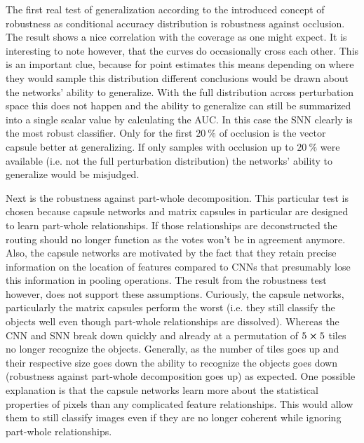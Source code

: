 The first real test of generalization according to the introduced concept of robustness as conditional accuracy distribution is robustness against occlusion. The result shows a nice correlation with the coverage as one might expect. It is interesting to note however, that the curves do occasionally cross each other. This is an important clue, because for point estimates this means depending on where they would sample this distribution different conclusions would be drawn about the networks’ ability to generalize. With the full distribution across perturbation space this does not happen and the ability to generalize can still be summarized into a single scalar value by calculating the AUC. In this case the SNN clearly is the most robust classifier. Only for the first $\SI{20}{\percent}$ of occlusion is the vector capsule better at generalizing. If only samples with occlusion up to $\SI{20}{\percent}$ were available (i.e. not the full perturbation distribution) the networks’ ability to generalize would be misjudged.

Next is the robustness against part-whole decomposition. This particular test is chosen because capsule networks and matrix capsules in particular are designed to learn part-whole relationships. If those relationships are deconstructed the routing should no longer function as the votes won’t be in agreement anymore. Also, the capsule networks are motivated by the fact that they retain precise information on the location of features compared to CNNs that presumably lose this information in pooling operations. The result from the robustness test however, does not support these assumptions. Curiously, the capsule networks, particularly the matrix capsules perform the worst (i.e. they still classify the objects well even though part-whole relationships are dissolved). Whereas the CNN and SNN break down quickly and already at a permutation of $5\cross 5$ tiles no longer recognize the objects. Generally, as the number of tiles goes up and their respective size goes down the ability to recognize the objects goes down (robustness against part-whole decomposition goes up) as expected. One possible explanation is that the capsule networks learn more about the statistical properties of pixels than any complicated feature relationships. This would allow them to still classify images even if they are no longer coherent while ignoring part-whole relationships.

